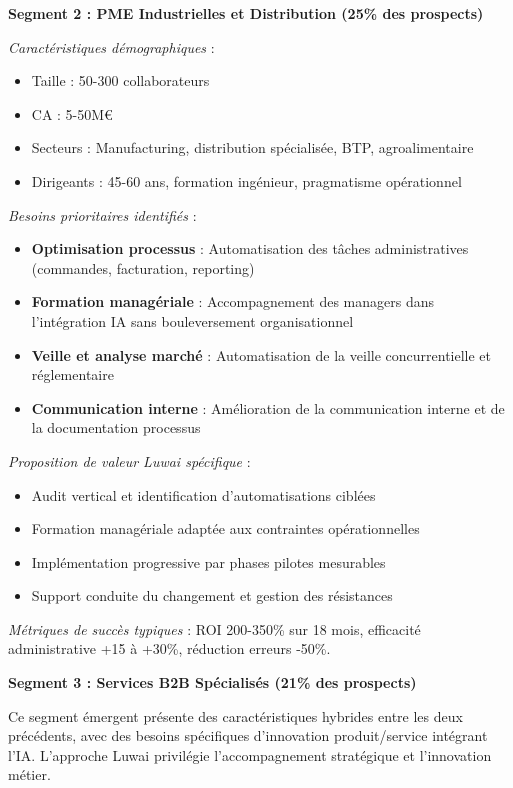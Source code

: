 \textbf{Segment 2 : PME Industrielles et Distribution (25\% des prospects)}

\emph{Caractéristiques démographiques} :
\begin{itemize}
    \item Taille : 50-300 collaborateurs
    \item CA : 5-50M€
    \item Secteurs : Manufacturing, distribution spécialisée, BTP, agroalimentaire
    \item Dirigeants : 45-60 ans, formation ingénieur, pragmatisme opérationnel
\end{itemize}

\emph{Besoins prioritaires identifiés} :
\begin{itemize}
    \item \textbf{Optimisation processus} : Automatisation des tâches administratives (commandes, facturation, reporting)
    \item \textbf{Formation managériale} : Accompagnement des managers dans l'intégration IA sans bouleversement organisationnel
    \item \textbf{Veille et analyse marché} : Automatisation de la veille concurrentielle et réglementaire
    \item \textbf{Communication interne} : Amélioration de la communication interne et de la documentation processus
\end{itemize}

\emph{Proposition de valeur Luwai spécifique} :
\begin{itemize}
    \item Audit vertical et identification d'automatisations ciblées
    \item Formation managériale adaptée aux contraintes opérationnelles
    \item Implémentation progressive par phases pilotes mesurables
    \item Support conduite du changement et gestion des résistances
\end{itemize}

\emph{Métriques de succès typiques} : ROI 200-350\% sur 18 mois, efficacité administrative +15 à +30\%, réduction erreurs -50\%.

\textbf{Segment 3 : Services B2B Spécialisés (21\% des prospects)}

Ce segment émergent présente des caractéristiques hybrides entre les deux précédents, avec des besoins spécifiques d'innovation produit/service intégrant l'IA. L'approche Luwai privilégie l'accompagnement stratégique et l'innovation métier.


